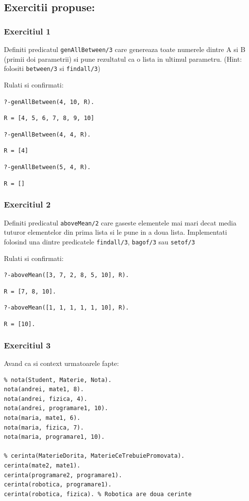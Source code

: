 \newpage

\subsection*{Exercitii propuse:}
\subsubsection*{Exercitiul 1}
Definiti predicatul \texttt{genAllBetween/3} care genereaza toate numerele dintre A si B (primii doi parametrii) si pune rezultatul ca o lista in ultimul parametru. (Hint: folositi \texttt{between/3} si \texttt{findall/3})

Rulati si confirmati:

\texttt{?-genAllBetween(4, 10, R).}

\texttt{R = [4, 5, 6, 7, 8, 9, 10]}

\texttt{?-genAllBetween(4, 4, R).}

\texttt{R = [4]}

\texttt{?-genAllBetween(5, 4, R).}

\texttt{R = []}




\subsubsection*{Exercitiul 2}
Definiti predicatul \texttt{aboveMean/2} care gaseste elementele mai mari decat media tuturor elementelor din prima lista si le pune in a doua lista. Implementati folosind una dintre predicatele \texttt{findall/3}, \texttt{bagof/3} sau \texttt{setof/3}

Rulati si confirmati:

\texttt{?-aboveMean([3, 7, 2, 8, 5, 10], R).}

\texttt{R = [7, 8, 10].}

\texttt{?-aboveMean([1, 1, 1, 1, 1, 10], R).}

\texttt{R = [10].}



\subsubsection*{Exercitiul 3}
Avand ca si context urmatoarele fapte:
\begin{lstlisting}
% nota(Student, Materie, Nota).
nota(andrei, mate1, 8).
nota(andrei, fizica, 4).
nota(andrei, programare1, 10).
nota(maria, mate1, 6).
nota(maria, fizica, 7).
nota(maria, programare1, 10).

% cerinta(MaterieDorita, MaterieCeTrebuiePromovata).
cerinta(mate2, mate1).
cerinta(programare2, programare1).
cerinta(robotica, programare1).
cerinta(robotica, fizica). % Robotica are doua cerinte
\end{lstlisting}

